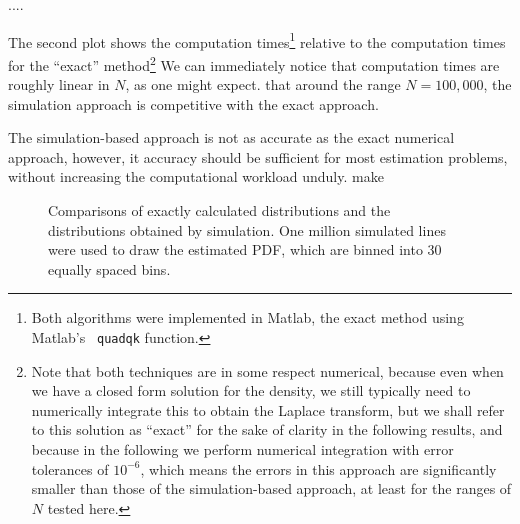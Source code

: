 ....





The second plot shows the computation times\footnote{Both algorithms
  were implemented in Matlab, the exact method using Matlab's {\tt
    quadqk} function. } relative to the computation times for the
``exact'' method\footnote{Note that both techniques are in some
  respect numerical, because even when we have a closed form solution
  for the density, we still typically need to numerically integrate
  this to obtain the Laplace transform, but we shall refer to this
  solution as ``exact'' for the sake of clarity in the following
  results, and because in the following we perform numerical
  integration with error tolerances of $10^{-6}$, which means the
  errors in this approach are significantly smaller than those of the
  simulation-based approach, at least for the ranges of $N$ tested
  here.}  We can immediately notice that computation times are roughly
linear in $N$, as one might expect. that around the range $N=100,000$,
the simulation approach is competitive with the exact approach.

The simulation-based approach is not as accurate as the exact
numerical approach, however, it accuracy should be sufficient for most
estimation problems, without increasing the computational workload
unduly.
make



\begin{figure}[tbp]
  \begin{center}


 

    \caption{\label{fig:sim_vs_exact}Comparisons of exactly calculated
      distributions and the distributions obtained by simulation. One
      million simulated lines were used to draw the estimated PDF,
      which are binned into 30 equally spaced bins.}
  \end{center} 
\vspace{-4mm}
\end{figure}



